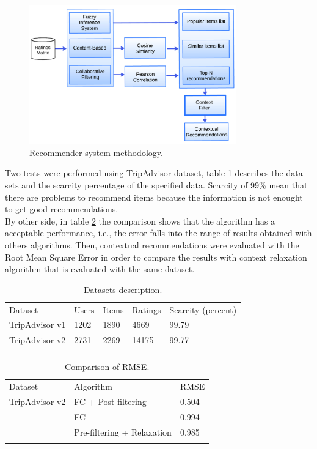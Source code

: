 \begin{figure}
\captionsetup{font=footnotesize}
\centering
\includegraphics[width=0.80\textwidth]{img/archit-ta.png}
\caption{Recommender system methodology.}
\label{fig:architecture}   
\end{figure}
Two tests were performed using TripAdvisor dataset, table
\ref{tab:3} describes the data sets and the scarcity percentage of the
specified data. Scarcity of 99\% mean that there are problems to
recommend items because the information is not enought to get 
good recommendations.\\  By other side, in table \ref{tab:4} the comparison
shows that the algorithm has a acceptable performance, i.e., the error
falls into the range of results obtained with others algorithms. Then,
contextual recommendations were evaluated with the Root Mean Square
Error in order to compare the results with context relaxation
algorithm\cite{zheng2012differential} that is evaluated with the same
dataset.
\begin{table}
\centering
\small
\captionsetup{font=footnotesize}
\caption{Datasets description.}
\label{tab:3}      
\begin{tabular}{lllll}
\hline\noalign{\smallskip}
Dataset & Users & Items & Ratings & Scarcity (percent) \\
\noalign{\smallskip}\hline\noalign{\smallskip}
TripAdvisor v1 & 1202 & 1890 & 4669 & 99.79 \\
TripAdvisor v2 & 2731 & 2269 & 14175 & 99.77 \\
\noalign{\smallskip}\hline
\end{tabular}
\end{table}
\begin{table}
\centering
\small
\captionsetup{font=footnotesize}
\caption{Comparison of RMSE.}
\label{tab:4}  
\small   
\begin{tabular}{lll}
\hline\noalign{\smallskip}
Dataset & Algorithm & RMSE \\
\noalign{\smallskip}\hline\noalign{\smallskip}
TripAdvisor v2 & FC + Post-filtering  & 0.504  \\
               & FC          & 0.994  \\
               & Pre-filtering + Relaxation & 0.985  \\
\noalign{\smallskip}\hline
\end{tabular}
\end{table}
